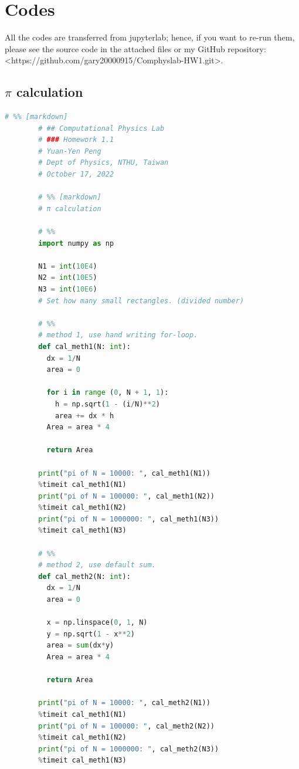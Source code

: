 \documentclass[12pt]{article}
\begin{document}
\section{Codes}
    All the codes are transferred from jupyterlab; hence, if you want to re-run them, please see the source code in the attached files or my GitHub repository: <https://github.com/gary20000915/Comphyslab-HW1.git>.
    \subsection{$\pi$ calculation}
      \begin{lstlisting}[language={Python}]
        # %% [markdown]
        # ## Computational Physics Lab 
        # ### Homework 1.1
        # Yuan-Yen Peng   
        # Dept of Physics, NTHU, Taiwan   
        # October 17, 2022   
        
        # %% [markdown]
        # π calculation
        
        # %%
        import numpy as np
        
        N1 = int(10E4)
        N2 = int(10E5)
        N3 = int(10E6)
        # Set how many small rectangles. (divided number)
        
        # %%
        # method 1, use hand writing for-loop.
        def cal_meth1(N: int):
          dx = 1/N
          area = 0
        
          for i in range (0, N + 1, 1):
            h = np.sqrt(1 - (i/N)**2)
            area += dx * h
          Area = area * 4
          
          return Area
        
        print("pi of N = 10000: ", cal_meth1(N1))
        %timeit cal_meth1(N1)
        print("pi of N = 100000: ", cal_meth1(N2))
        %timeit cal_meth1(N2)
        print("pi of N = 1000000: ", cal_meth1(N3))
        %timeit cal_meth1(N3)
        
        # %%
        # method 2, use default sum.
        def cal_meth2(N: int):
          dx = 1/N
          area = 0
          
          x = np.linspace(0, 1, N)
          y = np.sqrt(1 - x**2)
          area = sum(dx*y)
          Area = area * 4
          
          return Area
        
        print("pi of N = 10000: ", cal_meth2(N1))
        %timeit cal_meth1(N1)
        print("pi of N = 100000: ", cal_meth2(N2))
        %timeit cal_meth1(N2)
        print("pi of N = 1000000: ", cal_meth2(N3))
        %timeit cal_meth1(N3)
        

\end{lstlisting}
\end{document}
